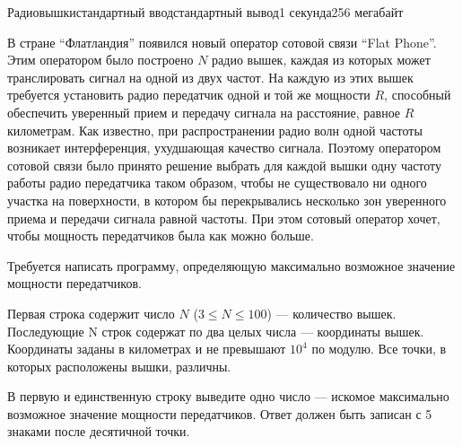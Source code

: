 \begin{problem}{Радиовышки}{стандартный ввод}{стандартный вывод}{1 секунда}{256 мегабайт}

В стране ``Флатландия'' появился новый оператор сотовой связи ``Flat Phone''. Этим оператором было построено $N$ радио вышек, каждая из которых может транслировать сигнал на одной из двух частот. На каждую из этих вышек требуется установить радио передатчик одной и той же мощности $R$, способный обеспечить уверенный прием и передачу сигнала на расстояние, равное $R$ километрам. Как известно, при распространении радио волн одной частоты возникает интерференция, ухудшающая качество сигнала. Поэтому оператором сотовой связи было принято решение выбрать для каждой вышки одну частоту работы радио передатчика таком образом, чтобы не существовало ни одного участка на поверхности, в котором бы перекрывались несколько зон уверенного приема и передачи сигнала равной частоты. При этом сотовый оператор хочет, чтобы мощность передатчиков была как можно больше.

Требуется написать программу, определяющую максимально возможное значение мощности передатчиков.

\InputFile
Первая строка содержит число $N$ ($3 \le N \le 100$) --- количество вышек. Последующие N строк содержат по два целых числа --- координаты вышек. Координаты заданы в километрах и не превышают $10^4$ по модулю. Все точки, в которых расположены вышки, различны.

\OutputFile
В первую и единственную строку выведите одно число --- искомое максимально возможное значение мощности передатчиков. Ответ должен быть записан с 5 знаками после десятичной точки.


\Example

\begin{example}
%
\end{example}

\end{problem}

